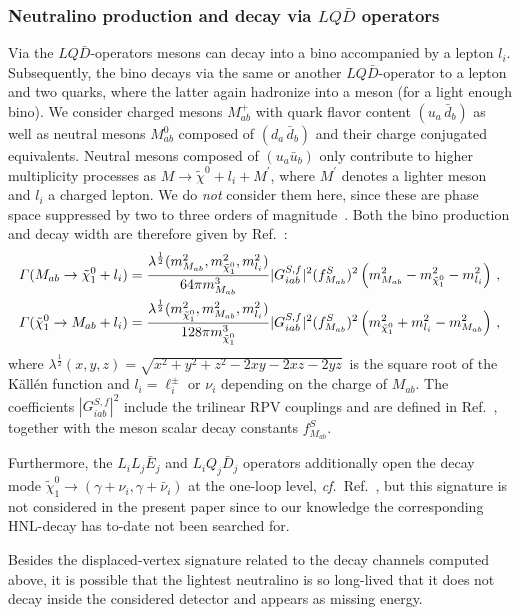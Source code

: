 \subsubsection{Neutralino production and decay via $LQ \bar D$ operators}
Via the $LQ \bar D$-operators mesons can decay into a bino accompanied by a lepton $l_i$. Subsequently, the bino 
decays via the same or another $LQ \bar D$-operator to a lepton and two quarks, where the latter again hadronize 
into a meson (for a light enough bino).
We consider charged mesons $M_{ab}^+$ with quark flavor content $(u_a \,\bar d_b)$ as well as neutral 
mesons $M_{ab}^0$ composed of $(d_a\, \bar d_b)$ and their charge conjugated equivalents. 
Neutral mesons composed of $(u_a \bar u_b)$ only contribute to higher multiplicity processes as $M \rightarrow \widetilde{\chi}^0+l_i+M^{\prime}$, where $M^{\prime}$ denotes a lighter meson and $l_i$ a charged lepton. We do \textit{not} consider them here, since these are phase space suppressed by two to three orders of magnitude~\cite{deVries:2015mfw}.
 Both the bino production and decay width are therefore given by Ref.~\cite{deVries:2015mfw}:
\begin{align}
    \varGamma(M_{ab} \rightarrow  \tilde\chi_1^0 + l_i) &= \frac{\lambda^{\frac{1}{2}}(m_{M_{ab}}^2, m_{\tilde\chi_1^0}^2, m_{l_i}^2)}{64\pi m_{M_{ab}}^3} |G_{iab}^{S,f}|^2 (f_{M_{ab}}^S)^2\left(m_{M_{ab}}^2-m_{\tilde\chi_1^0}^2-m_{l_i}^2\right) \, , \\
    \varGamma(\tilde\chi_1^0 \rightarrow M_{ab} + l_i) &= \frac{\lambda^{\frac{1}{2}}(m_{\tilde\chi_1^0}^2, m_{M_{ab}}^2, m_{l_i}^2)}{128\pi m_{\tilde\chi_1^0}^3} |G_{iab}^{S,f}|^2 (f_{M_{ab}}^S)^2\left(m_{\tilde\chi_1^0}^2+m_{l_i}^2-m_{M_{ab}}^2\right) \, ,
\end{align}
where $\lambda^{\frac{1}{2}}(x,y,z)=\sqrt{x^2+y^2+z^2-2xy-2xz-2yz}\,$ is the square root of the K\"all\'en function and 
$l_i = \ell^{\pm}_i$ or $\nu_i$ depending on the charge of $M_{ab}$. The coefficients $|G_{iab}^{S,f}|^2$ include the 
trilinear RPV couplings and are defined in Ref.~\cite{deVries:2015mfw}, together with the meson scalar decay constants $f_{M_{ab}}^S$.

Furthermore, the $L_iL_j\bar E_j$ and $L_iQ_j\bar D_j$ operators additionally open the decay mode $\tilde
\chi_1^0 \rightarrow (\gamma + \nu_i, \gamma + \bar\nu_i)$ at the one-loop level, 
\textit{cf.}~Ref.~\cite{Dreiner:2022swd}, but this signature is not considered in the present paper since to our knowledge the corresponding HNL-decay has to-date not been searched for.

Besides the displaced-vertex signature related to the decay channels computed above, it is possible that the lightest 
neutralino is so long-lived that it does not decay inside the considered detector and appears as missing energy. 


